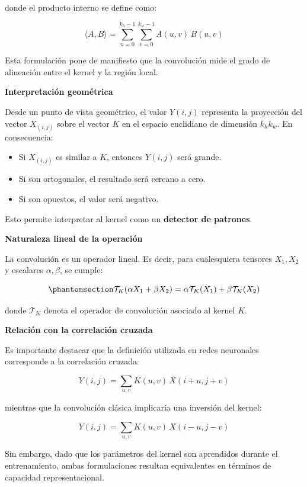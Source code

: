 \documentclass[
  spanish,
  us-letterpaper,
  DIV=11,
  numbers=noendperiod]{scrreprt}
\providecommand{\tightlist}{%
  \setlength{\itemsep}{0pt}\setlength{\parskip}{0pt}}
\begin{document}
donde el producto interno se define como:

\[
\langle A, B \rangle = \sum_{u=0}^{k_h-1} \sum_{v=0}^{k_w-1} A(u,v)\, B(u,v)
\]

Esta formulación pone de manifiesto que la convolución mide el grado de
alineación entre el kernel y la región local.

\textbf{Interpretación geométrica}

Desde un punto de vista geométrico, el valor \(Y(i,j)\) representa la
proyección del vector \(X_{(i,j)}\) sobre el vector \(K\) en el espacio
euclidiano de dimensión \(k_h k_w\). En consecuencia:

\begin{itemize}
\tightlist
\item
  Si \(X_{(i,j)}\) es similar a \(K\), entonces \(Y(i,j)\) será grande.
\item
  Si son ortogonales, el resultado será cercano a cero.
\item
  Si son opuestos, el valor será negativo.
\end{itemize}

Esto permite interpretar al kernel como un \textbf{detector de
patrones}.

\textbf{Naturaleza lineal de la operación}

La convolución es un operador lineal. Es decir, para cualesquiera
tensores \(X_1, X_2\) y escalares \(\alpha, \beta\), se cumple:

\begin{equation}\phantomsection\label{eq-linealidad}{
\mathcal{T}_K(\alpha X_1 + \beta X_2)
= \alpha \mathcal{T}_K(X_1) + \beta \mathcal{T}_K(X_2)
}\end{equation}

donde \(\mathcal{T}_K\) denota el operador de convolución asociado al
kernel \(K\).

\textbf{Relación con la correlación cruzada}

Es importante destacar que la definición utilizada en redes neuronales
corresponde a la correlación cruzada:

\[
Y(i,j) =
\sum_{u,v} K(u,v)\, X(i+u, j+v)
\]

mientras que la convolución clásica implicaría una inversión del kernel:

\[
Y(i,j) =
\sum_{u,v} K(u,v)\, X(i-u, j-v)
\]

Sin embargo, dado que los parámetros del kernel son aprendidos durante
el entrenamiento, ambas formulaciones resultan equivalentes en términos
de capacidad representacional.
\end{document}
